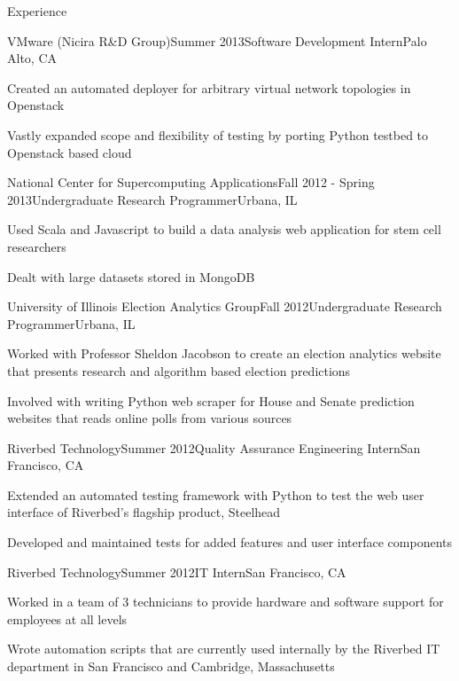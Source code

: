 \documentclass{resume} %
\begin{document}
\begin{rSection}{Experience}

\begin{rSubsection}{VMware (Nicira R\&D Group)}{Summer 2013}{Software Development Intern}{Palo Alto, CA}
\item Created an automated deployer for arbitrary virtual network topologies in Openstack
\item  Vastly expanded scope and flexibility of testing by porting Python testbed to Openstack based cloud
\end{rSubsection}

\begin{rSubsection}{National Center for Supercomputing Applications}{Fall 2012 - Spring 2013}{Undergraduate Research Programmer}{Urbana, IL}
\item Used Scala and Javascript to build a data analysis web application for stem cell researchers
\item Dealt with large datasets stored in MongoDB
\end{rSubsection}

\begin{rSubsection}{University of Illinois Election Analytics Group}{Fall 2012}{Undergraduate Research Programmer}{Urbana, IL}
\item Worked with Professor Sheldon Jacobson to create an election analytics website that presents research and algorithm based election predictions 
\item Involved with writing Python web scraper for House and Senate prediction websites that reads online polls from various sources
\end{rSubsection}

\begin{rSubsection}{Riverbed Technology}{Summer 2012}{Quality Assurance Engineering Intern}{San Francisco, CA}
\item Extended an automated testing framework with Python to test the web user interface of Riverbed's flagship product, Steelhead 
\item Developed and maintained tests for added features and user interface components
\end{rSubsection}

\begin{rSubsection}{Riverbed Technology}{Summer 2012}{IT Intern}{San Francisco, CA}
\item Worked in a team of 3 technicians to provide hardware and software support for employees at all levels 
\item Wrote automation scripts that are currently used internally by the Riverbed IT department in San Francisco and Cambridge, Massachusetts
\end{rSubsection}


\end{rSection}
\end{document}
